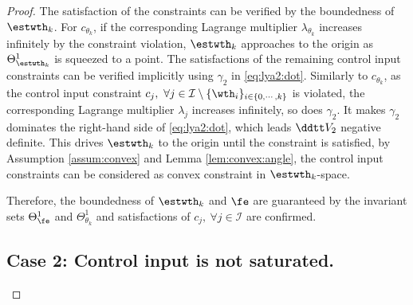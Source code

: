 \documentclass[lettersize,journal]{IEEEtran}
\begin{document}
\begin{proof}
The satisfaction of the constraints can be verified by the boundedness of $\estwth_k$.
For $c_{\theta_k}$, if the corresponding Lagrange multiplier $\lambda_{\theta_k}$ increases infinitely by the constraint violation, $\estwth_k$ approaches to the origin as $\Theta_{\estwth_k}^{1}$ is squeezed to a point.
The satisfactions of the remaining control input constraints can be verified implicitly using ${\gamma}_2$ in \eqref{eq:lya2:dot}.
Similarly to $c_{\theta_k}$, as the control input constraint $c_j,\ \forall j\in\mathcal{I}\setminus \{\wth_i\}_{i\in\{0,\cdots,k\}}$ is violated, the corresponding Lagrange multiplier $\lambda_j$ increases infinitely, so does ${\gamma}_2$.
It makes ${\gamma}_2$ dominates the right-hand side of \eqref{eq:lya2:dot}, which leads $\ddtt V_2$ negative definite.
This drives $\estwth_k$ to the origin until the constraint is satisfied, \ie by Assumption \ref{assum:convex} and Lemma \ref{lem:convex:angle}, the control input constraints can be considered as convex constraint in $\estwth_k$-space.

Therefore, the boundedness of $\estwth_k$ and $\fe$ are guaranteed by the invariant sets $\Theta_{\fe}^{1}$ and $\Theta_{\theta_k}^{1}$ and satisfactions of $c_j,\ \forall j\in\mathcal{I}$ are confirmed.

\subsection*{Case 2: Control input is not saturated.}


\end{proof}
\end{document}
